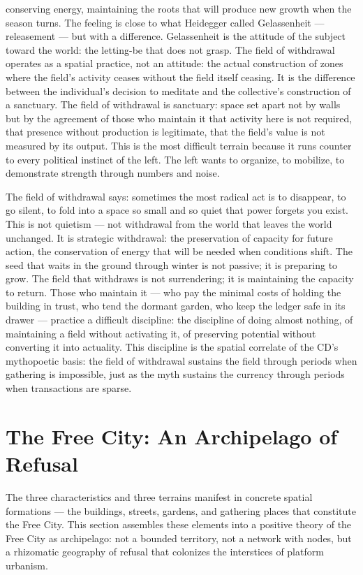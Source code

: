 conserving energy, maintaining the roots that will produce new growth when the season turns. The feeling is close to what Heidegger called Gelassenheit — releasement — but with a difference. Gelassenheit is the attitude of the subject toward the world: the letting-be that does not grasp. The field of withdrawal operates as a spatial practice, not an attitude: the actual construction of zones where the field’s activity ceases without the field itself ceasing. It is the difference between the individual’s decision to meditate and the collective’s construction of a sanctuary. The field of withdrawal is sanctuary: space set apart not by walls but by the agreement of those who maintain it that activity here is not required, that presence without production is legitimate, that the field’s value is not measured by its output. This is the most difficult terrain because it runs counter to every political instinct of the left. The left wants to organize, to mobilize, to demonstrate strength through numbers and noise.

The field of withdrawal says: sometimes the most radical act is to disappear, to go silent, to fold into a space so small and so quiet that power forgets you exist. This is not quietism — not withdrawal from the world that leaves the world unchanged. It is strategic withdrawal: the preservation of capacity for future action, the conservation of energy that will be needed when conditions shift. The seed that waits in the ground through winter is not passive; it is preparing to grow. The field that withdraws is not surrendering; it is maintaining the capacity to return. Those who maintain it — who pay the minimal costs of holding the building in trust, who tend the dormant garden, who keep the ledger safe in its drawer — practice a difficult discipline: the discipline of doing almost nothing, of maintaining a field without activating it, of preserving potential without converting it into actuality. This discipline is the spatial correlate of the CD’s mythopoetic basis: the field of withdrawal sustains the field through periods when gathering is impossible, just as the myth sustains the currency through periods when transactions are sparse.

\section{The Free City: An Archipelago of Refusal}

The three characteristics and three terrains manifest in concrete spatial formations — the buildings, streets, gardens, and gathering places that constitute the Free City. This section assembles these elements into a positive theory of the Free City as archipelago: not a bounded territory, not a network with nodes, but a rhizomatic geography of refusal that colonizes the interstices of platform urbanism.

